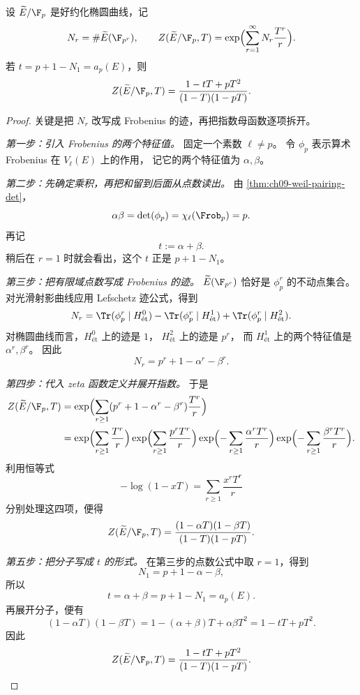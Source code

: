 \begin{lemma}
\label{lem:ch09-local-zeta-elliptic}
设 $\widetilde E/\F_p$ 是好约化椭圆曲线，记
\[
  N_r=\#\widetilde E(\F_{p^r}),
  \qquad
  Z(\widetilde E/\F_p,T)=\exp\Bigl(\sum_{r=1}^\infty N_r\frac{T^r}{r}\Bigr).
\]
若 $t=p+1-N_1=a_p(E)$，则
\[
  Z(\widetilde E/\F_p,T)=\frac{1-tT+pT^2}{(1-T)(1-pT)}.
\]
\end{lemma}

\begin{proof}
关键是把 $N_r$ 改写成 Frobenius 的迹，再把指数母函数逐项拆开。

\textit{第一步：引入 Frobenius 的两个特征值。}
固定一个素数 $\ell\neq p$。
令 $\phi_p$ 表示算术 Frobenius 在 $V_\ell(E)$ 上的作用，
记它的两个特征值为 $\alpha,\beta$。

\textit{第二步：先确定乘积，再把和留到后面从点数读出。}
由 \cref{thm:ch09-weil-pairing-det}，
\[
  \alpha\beta=\det(\phi_p)=\chi_\ell(\Frob_p)=p.
\]
再记
\[
  t:=\alpha+\beta.
\]
稍后在 $r=1$ 时就会看出，这个 $t$ 正是 $p+1-N_1$。

\textit{第三步：把有限域点数写成 Frobenius 的迹。}
$\widetilde E(\F_{p^r})$ 恰好是 $\phi_p^r$ 的不动点集合。
对光滑射影曲线应用 Lefschetz 迹公式，得到
\[
  N_r
  =
  \Tr(\phi_p^r\mid H^0_{\text{\'et}})
  -\Tr(\phi_p^r\mid H^1_{\text{\'et}})
  +\Tr(\phi_p^r\mid H^2_{\text{\'et}}).
\]
对椭圆曲线而言，$H^0_{\text{\'et}}$ 上的迹是 $1$，
$H^2_{\text{\'et}}$ 上的迹是 $p^r$，
而 $H^1_{\text{\'et}}$ 上的两个特征值是 $\alpha^r,\beta^r$。
因此
\[
  N_r=p^r+1-\alpha^r-\beta^r.
\]

\textit{第四步：代入 zeta 函数定义并展开指数。}
于是
\begin{align*}
  Z(\widetilde E/\F_p,T)
  &=
  \exp\Bigl(\sum_{r\ge 1}(p^r+1-\alpha^r-\beta^r)\frac{T^r}{r}\Bigr)\\
  &=
  \exp\Bigl(\sum_{r\ge 1}\frac{T^r}{r}\Bigr)
  \exp\Bigl(\sum_{r\ge 1}\frac{p^rT^r}{r}\Bigr)
  \exp\Bigl(-\sum_{r\ge 1}\frac{\alpha^rT^r}{r}\Bigr)
  \exp\Bigl(-\sum_{r\ge 1}\frac{\beta^rT^r}{r}\Bigr).
\end{align*}
利用恒等式
\[
  -\log(1-xT)=\sum_{r\ge 1}\frac{x^rT^r}{r}
\]
分别处理这四项，便得
\[
  Z(\widetilde E/\F_p,T)=\frac{(1-\alpha T)(1-\beta T)}{(1-T)(1-pT)}.
\]

\textit{第五步：把分子写成 $t$ 的形式。}
在第三步的点数公式中取 $r=1$，得到
\[
  N_1=p+1-\alpha-\beta,
\]
所以
\[
  t=\alpha+\beta=p+1-N_1=a_p(E).
\]
再展开分子，便有
\[
  (1-\alpha T)(1-\beta T)
  =1-(\alpha+\beta)T+\alpha\beta T^2
  =1-tT+pT^2.
\]
因此
\[
  Z(\widetilde E/\F_p,T)=\frac{1-tT+pT^2}{(1-T)(1-pT)}. \qedhere
\]
\end{proof}

